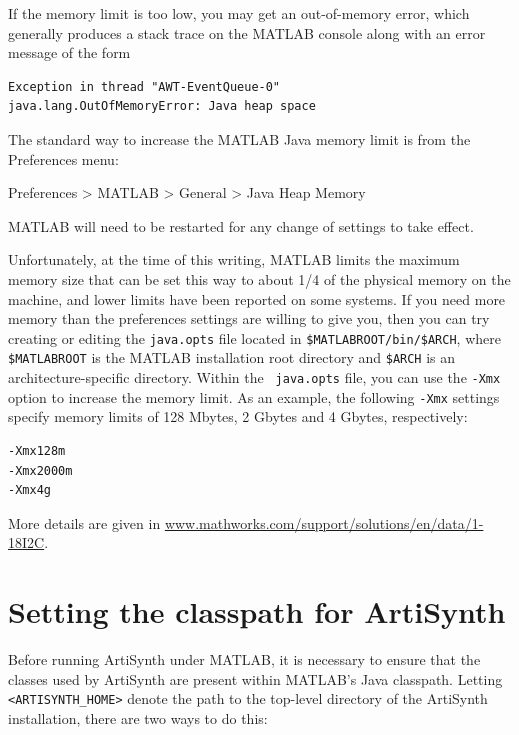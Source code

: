 \documentclass{article}
\begin{document}
If the memory limit is too low, you may get an out-of-memory error,
which generally produces a stack trace on the MATLAB console along
with an error message of the form
%
\begin{lstlisting}[]
Exception in thread "AWT-EventQueue-0"
java.lang.OutOfMemoryError: Java heap space
\end{lstlisting}
%

The standard way to increase the MATLAB Java memory limit is from the
{\sf Preferences} menu:

{\sf Preferences > MATLAB > General > Java Heap Memory}

MATLAB will need to be restarted for any change of settings to take
effect.

Unfortunately, at the time of this writing, MATLAB limits the maximum
memory size that can be set this way to about 1/4 of the physical
memory on the machine, and lower limits have been reported on some
systems. If you need more memory than the preferences
settings are willing to give you, then you can try creating or editing
the {\tt java.opts} file located in {\tt \$MATLABROOT/bin/\$ARCH},
where {\tt \$MATLABROOT} is the MATLAB installation root directory and
{\tt \$ARCH} is an architecture-specific directory. Within the {\tt
java.opts} file, you can use the {\tt -Xmx} option to increase the
memory limit. As an example, the following {\tt -Xmx} settings
specify memory limits of 128 Mbytes, 2 Gbytes and 4 Gbytes,
respectively:
%
\begin{lstlisting}[]
-Xmx128m 
-Xmx2000m
-Xmx4g
\end{lstlisting}
%
More details are given in
\href{http://www.mathworks.com/support/solutions/en/data/1-18I2C}
{www.mathworks.com/support/solutions/en/data/1-18I2C}.

\section{Setting the classpath for ArtiSynth}
\label{ArtisynthClasspath:sec}

Before running ArtiSynth under MATLAB, it is necessary to ensure that
the classes used by ArtiSynth are present within MATLAB's Java
classpath. Letting {\tt <ARTISYNTH\_HOME>} denote the path to the
top-level directory of the ArtiSynth installation, there are
two ways to do this:
\end{document}
